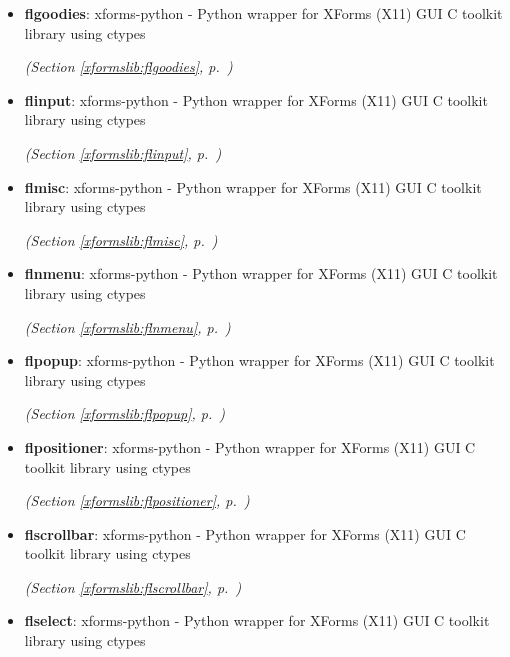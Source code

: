 \begin{itemize}
\item \textbf{flgoodies}: 
xforms-python - Python wrapper for XForms (X11) GUI C toolkit library
using ctypes




  \textit{(Section \ref{xformslib:flgoodies}, p.~\pageref{xformslib:flgoodies})}

\item \textbf{flinput}: 
xforms-python - Python wrapper for XForms (X11) GUI C toolkit library
using ctypes




  \textit{(Section \ref{xformslib:flinput}, p.~\pageref{xformslib:flinput})}

\item \textbf{flmisc}: 
xforms-python - Python wrapper for XForms (X11) GUI C toolkit library
using ctypes




  \textit{(Section \ref{xformslib:flmisc}, p.~\pageref{xformslib:flmisc})}

\item \textbf{flnmenu}: 
xforms-python - Python wrapper for XForms (X11) GUI C toolkit library
using ctypes




  \textit{(Section \ref{xformslib:flnmenu}, p.~\pageref{xformslib:flnmenu})}

\item \textbf{flpopup}: 
xforms-python - Python wrapper for XForms (X11) GUI C toolkit library
using ctypes




  \textit{(Section \ref{xformslib:flpopup}, p.~\pageref{xformslib:flpopup})}

\item \textbf{flpositioner}: 
xforms-python - Python wrapper for XForms (X11) GUI C toolkit library
using ctypes




  \textit{(Section \ref{xformslib:flpositioner}, p.~\pageref{xformslib:flpositioner})}

\item \textbf{flscrollbar}: 
xforms-python - Python wrapper for XForms (X11) GUI C toolkit library
using ctypes




  \textit{(Section \ref{xformslib:flscrollbar}, p.~\pageref{xformslib:flscrollbar})}

\item \textbf{flselect}: 
xforms-python - Python wrapper for XForms (X11) GUI C toolkit library
using ctypes





\end{itemize}
